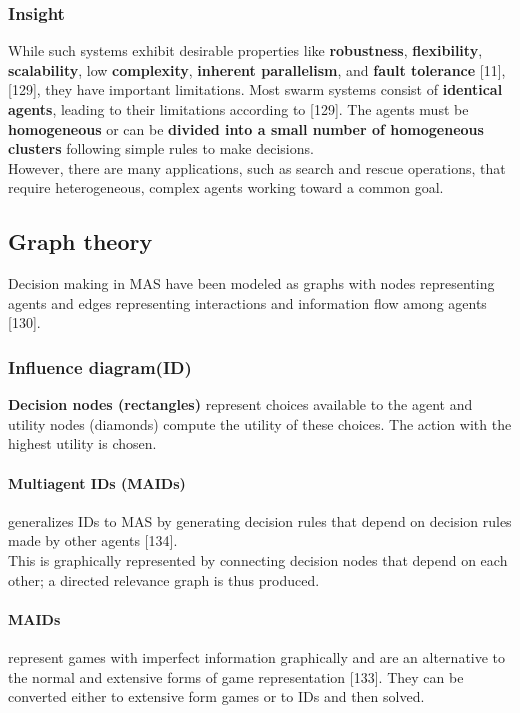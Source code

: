 \documentclass{article}
\begin{document}
			\subsubsection{Insight}
			While such systems exhibit desirable properties like \textbf{robustness}, \textbf{flexibility}, \textbf{scalability}, low \textbf{complexity}, \textbf{inherent parallelism}, and \textbf{fault tolerance} \citep{rizk-2018-decision-making-in-multiagent-systems-a-survey}[11], [129], they have important limitations. Most swarm systems consist of \textbf{identical agents}, leading to their limitations according to \citet{rizk-2018-decision-making-in-multiagent-systems-a-survey}[129]. The agents must be \textbf{homogeneous} or can be \textbf{divided into a small number of homogeneous clusters} following simple rules to make decisions. 
			\\
			However, there are many applications, such as search and rescue operations, that require heterogeneous, complex agents working toward a common goal.
		
		\subsection{Graph theory}
			Decision making in MAS have been modeled as graphs with nodes representing agents and edges representing interactions and information flow among agents \citet{rizk-2018-decision-making-in-multiagent-systems-a-survey}[130]. 
			\subsubsection{Influence diagram(ID)}
			\textbf{Decision nodes (rectangles)} represent choices available to the agent and utility nodes (diamonds) compute the utility of these choices. The action with the highest utility is chosen. 
				\paragraph{Multiagent IDs (MAIDs)} generalizes IDs to MAS by generating decision rules that depend on decision rules made by other agents  \citet{rizk-2018-decision-making-in-multiagent-systems-a-survey}[134]. 
				\\
				This is graphically represented by connecting decision nodes that depend on each other; a directed relevance graph is thus produced. 
				\\
				\paragraph{MAIDs} represent games with imperfect information graphically and are an alternative to the normal and extensive forms of game representation  \citet{rizk-2018-decision-making-in-multiagent-systems-a-survey}[133]. They can be converted either to extensive form games or to IDs and then solved.
\end{document}

